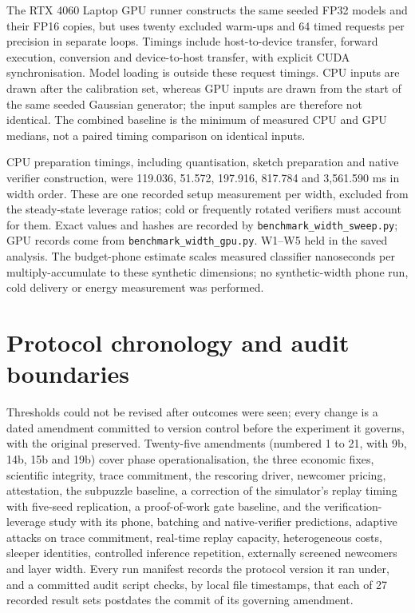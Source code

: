 \documentclass[11pt]{article}
\begin{document}
The RTX 4060 Laptop GPU runner constructs the same seeded FP32 models and their FP16 copies, but uses twenty excluded warm-ups and 64 timed requests per precision in separate loops. Timings include host-to-device transfer, forward execution, conversion and device-to-host transfer, with explicit CUDA synchronisation. Model loading is outside these request timings. CPU inputs are drawn after the calibration set, whereas GPU inputs are drawn from the start of the same seeded Gaussian generator; the input samples are therefore not identical. The combined baseline is the minimum of measured CPU and GPU medians, not a paired timing comparison on identical inputs.

CPU preparation timings, including quantisation, sketch preparation and native verifier construction, were 119.036, 51.572, 197.916, 817.784 and 3,561.590 ms in width order. These are one recorded setup measurement per width, excluded from the steady-state leverage ratios; cold or frequently rotated verifiers must account for them. Exact values and hashes are recorded by \texttt{benchmark\_width\_sweep.py}; GPU records come from \texttt{benchmark\_width\_gpu.py}. W1--W5 held in the saved analysis. The budget-phone estimate scales measured classifier nanoseconds per multiply-accumulate to these synthetic dimensions; no synthetic-width phone run, cold delivery or energy measurement was performed.

\section{Protocol chronology and audit boundaries}

Thresholds could not be revised after outcomes were seen; every change is a dated amendment committed to version control before the experiment it governs, with the original preserved. Twenty-five amendments (numbered 1 to 21, with 9b, 14b, 15b and 19b) cover phase operationalisation, the three economic fixes, scientific integrity, trace commitment, the rescoring driver, newcomer pricing, attestation, the subpuzzle baseline, a correction of the simulator's replay timing with five-seed replication, a proof-of-work gate baseline, and the verification-leverage study with its phone, batching and native-verifier predictions, adaptive attacks on trace commitment, real-time replay capacity, heterogeneous costs, sleeper identities, controlled inference repetition, externally screened newcomers and layer width. Every run manifest records the protocol version it ran under, and a committed audit script checks, by local file timestamps, that each of 27 recorded result sets postdates the commit of its governing amendment.
\end{document}
